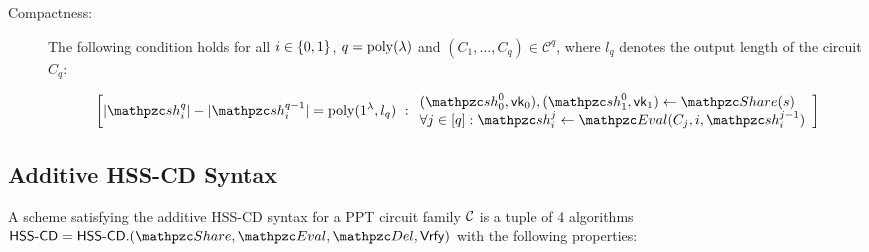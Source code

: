 \begin{description}
\item [Compactness:] The following condition holds for all $i \in
\{0,1\}$, $q = {\mathrm{poly}}(\lambda)$ and $(C_1, \ldots, C_q) \in
\mathcal{C}^q$, where $l_q$ denotes the output length of the circuit
$C_q$:

\begin{align}
\left[
|\qsh_i^q| - |\qsh_i^{q-1}| = \poly(1^\secp, l_q)
\ :
\begin{array}{ll}
(\qsh_0^0, \vk_0), (\qsh_1^0, \vk_1) \gets \Sh(s)\\
\forall j \in [q]: \qsh_i^j \leftarrow \Ev(C_j, i,
\qsh_i^{j-1})\\
\end{array}
\right]
\end{align}
\end{description}

\subsection{Additive HSS-CD Syntax}

A scheme satisfying the additive HSS-CD syntax for a PPT circuit
family $\mathcal{C}$ is a tuple of 4
algorithms $\HSScd = \HSScd.(\Sh, \Ev, \Del, \Vrfy)$ with the
following properties:

